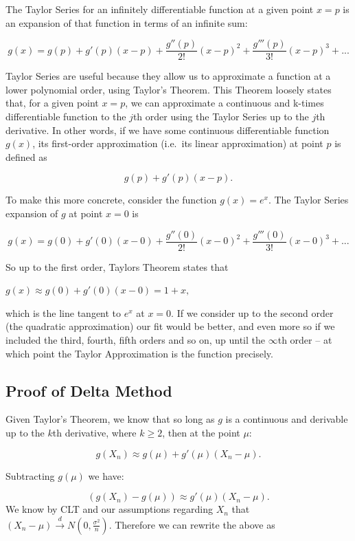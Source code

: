 \documentclass[
]{book}
\begin{document}
The Taylor Series for an infinitely differentiable function at a given point \(x=p\) is an expansion of that function in terms of an infinite sum:

\[
g(x) = g(p) + g'(p)(x-p) + \frac{g''(p)}{2!}(x-p)^2 + \frac{g'''(p)}{3!}(x-p)^3 + ...
\]

Taylor Series are useful because they allow us to approximate a function at a lower polynomial order, using Taylor's Theorem. This Theorem loosely states that, for a given point \(x=p\), we can approximate a continuous and k-times differentiable function to the \(j\)th order using the Taylor Series up to the \(j\)th derivative. In other words, if we have some continuous differentiable function \(g(x)\), its first-order approximation (i.e.~its linear approximation) at point \(p\) is defined as

\[g(p) + g'(p)(x-p).\]

To make this more concrete, consider the function \(g(x) = e^x\). The Taylor Series expansion of \(g\) at point \(x=0\) is

\[g(x) = g(0) + g'(0)(x-0) +  \frac{g''(0)}{2!}(x-0)^2 + \frac{g'''(0)}{3!}(x-0)^3 + ...\]

So up to the first order, Taylors Theorem states that

\(g(x) \approx g(0)+g'(0)(x-0) = 1 + x,\)

which is the line tangent to \(e^x\) at \(x=0\). If we consider up to the second order (the quadratic approximation) our fit would be better, and even more so if we included the third, fourth, fifth orders and so on, up until the \(\infty\)th order -- at which point the Taylor Approximation is the function precisely.

\hypertarget{proof-of-delta-method}{%
\subsection{Proof of Delta Method}\label{proof-of-delta-method}}

Given Taylor's Theorem, we know that so long as \(g\) is a continuous and derivable up to the \(k\)th derivative, where \(k \geq 2\), then at the point \(\mu\):

\[ g(X_n) \approx g(\mu) + g'(\mu)(X_n-\mu). \]

Subtracting \(g(\mu)\) we have:

\[
\left(g(X_n) - g(\mu)\right) \approx g'(\mu)(X_n-\mu).
\]
We know by CLT and our assumptions regarding \(X_n\) that \((X_n-\mu) \xrightarrow{d} N(0,\frac{\sigma^2}{n})\). Therefore we can rewrite the above as
\end{document}
